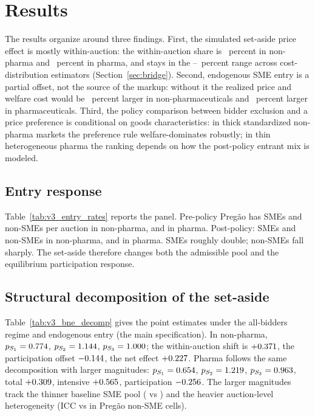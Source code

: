 \section{Results}\label{sec:results}

The results organize around three findings. First, the simulated set-aside price effect is mostly within-auction: the within-auction share is \bneShareIntensNp~percent in non-pharma and \bneShareIntensPh~percent in pharma, and stays in the \withinShareLow--\withinShareHigh~percent range across cost-distribution estimators (Section~\ref{sec:bridge}). Second, endogenous SME entry is a partial offset, not the source of the markup: without it the realized price and welfare cost would be \latentShockRatioNp~percent larger in non-pharmaceuticals and \latentShockRatioPh~percent larger in pharmaceuticals. Third, the policy comparison between bidder exclusion and a \optPrefThreshold{} price preference is conditional on goods characteristics: in thick standardized non-pharma markets the preference rule welfare-dominates robustly; in thin heterogeneous pharma the ranking depends on how the post-policy entrant mix is modeled.

\subsection{Entry response}

Table~\ref{tab:v3_entry_rates} reports the panel. Pre-policy Preg\~ao has \bneNsmePreNp{} SMEs and \bneNnsPreNp{} non-SMEs per auction in non-pharma, \bneNsmePrePh{} and \bneNnsPrePh{} in pharma. Post-policy: \bneNsmePostNp{} SMEs and \nonSmePostNp{} non-SMEs in non-pharma, \bneNsmePostPh{} and \nonSmePostPh{} in pharma. SMEs roughly double; non-SMEs fall sharply. The set-aside therefore changes both the admissible pool and the equilibrium participation response.

\subsection{Structural decomposition of the set-aside}

Table~\ref{tab:v3_bne_decomp} gives the point estimates under the all-bidders regime and endogenous entry (the main specification). In non-pharma, $p_{S_1} = 0.774$, $p_{S_2} = 1.144$, $p_{S_3} = 1.000$; the within-auction shift is $+0.371$, the participation offset $-0.144$, the net effect $+0.227$. Pharma follows the same decomposition with larger magnitudes: $p_{S_1} = 0.654$, $p_{S_2} = 1.219$, $p_{S_3} = 0.963$, total $+0.309$, intensive $+0.565$, participation $-0.256$. The larger magnitudes track the thinner baseline SME pool (\bneNsmePrePh{} vs \bneNsmePreNp{}) and the heavier auction-level heterogeneity (ICC \iccDecompContrastPh{} vs \iccDecompContrastNp{} in Preg\~ao non-SME cells).

